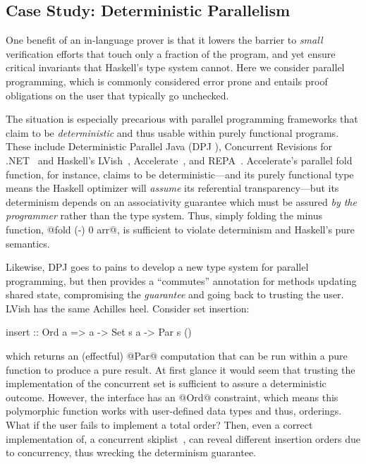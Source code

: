 \subsection{Case Study: Deterministic Parallelism}
\label{sec:detpar}


One benefit of an in-language prover is that it lowers
the barrier to \emph{small} verification efforts that
touch only a fraction of the program, and yet
ensure critical invariants that Haskell's type
system cannot.
%
Here we consider parallel programming, which is commonly
considered error prone and entails proof obligations on
the user that typically go unchecked.

The situation is especially precarious with parallel
programming frameworks that claim to be \emph{deterministic}
and thus usable within purely functional programs.
These include Deterministic Parallel Java (DPJ \cite{DPJ}),
Concurrent Revisions for .NET~\cite{concurrent-revisions-oopsla}
and Haskell's LVish~\cite{kuper2014freeze},
Accelerate~\cite{accelerate-icfp13},
and REPA~\cite{repa-icfp10}.
%
Accelerate's parallel fold function, for instance,
claims to be deterministic---and its purely functional
type means the Haskell optimizer will \emph{assume}
its referential transparency---but its determinism
depends on an associativity guarantee which must
be assured \emph{by the programmer} rather than
the type system.
%
Thus, simply folding the minus function, @fold (-) 0 arr@,
is sufficient to violate determinism and Haskell's pure semantics.

Likewise, DPJ goes to pains to develop a new type
system for parallel programming, but then provides
a ``commutes'' annotation for methods updating shared
state, compromising the \emph{guarantee} and going
back to trusting the user.
%
LVish has the same Achilles heel. Consider set insertion:
%
\begin{code}
  insert :: Ord a => a -> Set s a -> Par s ()
\end{code}
%
which returns an (effectful) @Par@ computation that can be
run within a pure function to produce a pure result.
%
At first glance it would seem that trusting the implementation of the
concurrent set is sufficient to assure a deterministic outcome.
%
However, the interface has an @Ord@ constraint, which means
this polymorphic function works with user-defined data types
and thus, orderings.
%
What if the user fails to implement a total order?
%
Then, even a correct implementation of, \eg a concurrent
skiplist~\cite{concurrent-skiplist}, can reveal different
insertion orders due to concurrency, thus wrecking the
determinism guarantee.

